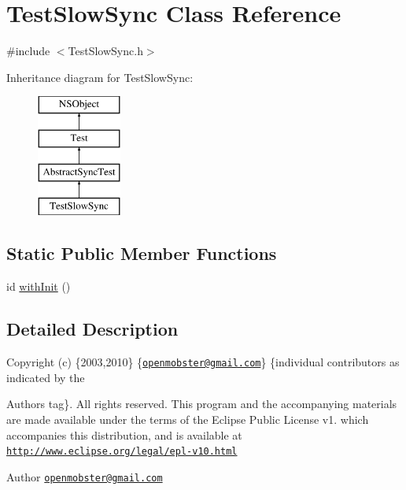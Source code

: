 \hypertarget{interface_test_slow_sync}{
\section{\-Test\-Slow\-Sync \-Class \-Reference}
\label{interface_test_slow_sync}
}


{\ttfamily \#include $<$\-Test\-Slow\-Sync.\-h$>$}

\-Inheritance diagram for \-Test\-Slow\-Sync\-:\begin{figure}[H]
\begin{center}
\leavevmode
\includegraphics[height=4.000000cm]{interface_test_slow_sync}
\end{center}
\end{figure}
\subsection*{\-Static \-Public \-Member \-Functions}
\begin{DoxyCompactItemize}
\item 
id \hyperlink{interface_test_slow_sync_a934a775a052200866aea08d044ab91ae}{with\-Init} ()
\end{DoxyCompactItemize}


\subsection{\-Detailed \-Description}
\-Copyright (c) \{2003,2010\} \{\href{mailto:openmobster@gmail.com}{\tt openmobster@gmail.\-com}\} \{individual contributors as indicated by the \begin{DoxyAuthor}{\-Authors}
tag\}. \-All rights reserved. \-This program and the accompanying materials are made available under the terms of the \-Eclipse \-Public \-License v1. which accompanies this distribution, and is available at \href{http://www.eclipse.org/legal/epl-v10.html}{\tt http\-://www.\-eclipse.\-org/legal/epl-\/v10.\-html}
\end{DoxyAuthor}
\begin{DoxyAuthor}{\-Author}
\href{mailto:openmobster@gmail.com}{\tt openmobster@gmail.\-com} 
\end{DoxyAuthor}


